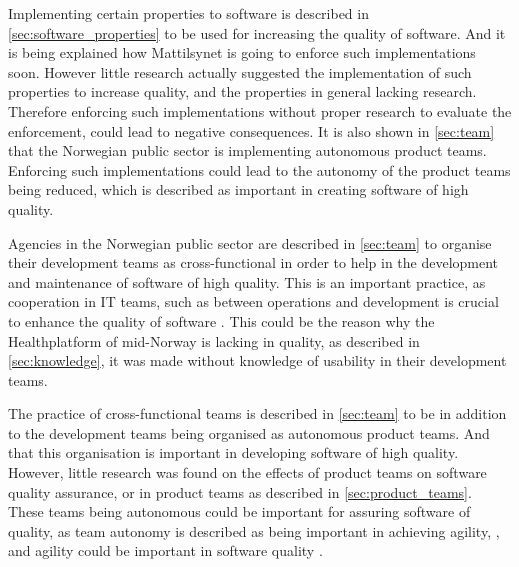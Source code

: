Implementing certain properties to software is described in \autoref{sec:software_properties} to be used for increasing the quality of software. And it is being explained how Mattilsynet is going to enforce such implementations soon. However little research actually suggested the implementation of such properties to increase quality, and the properties in general lacking research. Therefore enforcing such implementations without proper research to evaluate the enforcement, could lead to negative consequences. It is also shown in \autoref{sec:team} that the Norwegian public sector is implementing autonomous product teams. Enforcing such implementations could lead to the autonomy of the product teams being reduced, which is described as important in creating software of high quality.


Agencies in the Norwegian public sector are described in \autoref{sec:team} to organise their development teams as cross-functional in order to help in the development and maintenance of software of high quality. This is an important practice, as cooperation in IT teams, such as between operations and development is crucial to enhance the quality of software \cite{aw_2019}. This could be the reason why the Healthplatform of mid-Norway is lacking in quality, as described in \autoref{sec:knowledge}, it was made without knowledge of usability in their development teams.

The practice of cross-functional teams is described in \autoref{sec:team} to be in addition to the development teams being organised as autonomous product teams. And that this organisation is important in developing software of high quality. However, little research was found on the effects of product teams on software quality assurance, or in product teams as described in \autoref{sec:product_teams}. These teams being autonomous could be important for assuring software of quality, as team autonomy is described as being important in achieving agility, \cite{gl_2010}, and agility could be important in software quality \cite{mh_2004}.

